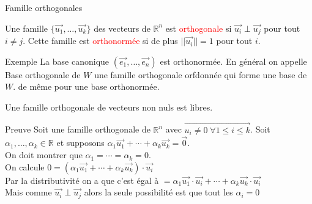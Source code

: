 \begin{parag}{Famille orthogonales}
    \begin{definition}
        Une famille $\{\vec{u_1}, \dots, \vec{u_k}\}$ des vecteurs de $\mathbb{R}^n$ est \textcolor{red}{orthogonale} si $\vec{u_i}\perp \vec{u_j}$ pour tout $i \neq j$. Cette famille est \textcolor{red}{orthonormée} si de plus $||\vec{u_i}|| = 1$ pour tout $i$.
    \end{definition}
    \begin{subparag}{Exemple}
        La base canonique $(\vec{e_1}, \dots, \vec{e_n})$ est orthonormée. En général on appelle Base orthogonale de $W$ une famille orthogonale orfdonnée qui forme une base de $W$. de même pour une base orthonormée.
    \end{subparag}
    \begin{theoreme}
        Une famille orthogonale de vecteurs non nuls est libres.
    \end{theoreme}
    \begin{subparag}{Preuve}
        Soit une famille orthogonale de $\mathbb{R}^n$ avec $\vec{u_i \neq 0 \; \forall 1 \leq i \leq k}$. Soit $\alpha_1, \dots, \alpha_k \in \mathbb{R}$ et supposons $\alpha_1 \vec{u_1} + \cdots + \alpha_k\vec{u_k} = \vec{0}$. \\
        On doit montrer que $\alpha_1 = \cdots = \alpha_k = 0$.
        \\
        On calcule $0 = (\alpha_1\vec{u_1} + \cdots + \alpha_k\vec{u_k})\cdot \vec{u_i}$\\
        Par la distributivité on a que c'est égal à $ = \alpha_1\vec{u_1}\cdot\vec{u_i} + \cdots + \alpha_k\vec{u_k}\cdot\vec{u_i}$\\
        Mais comme $\vec{u_i}\perp\vec{u_j}$ alors la seule possibilité est que tout les $\alpha_i = 0$
        
        
    \end{subparag}
\end{parag}


